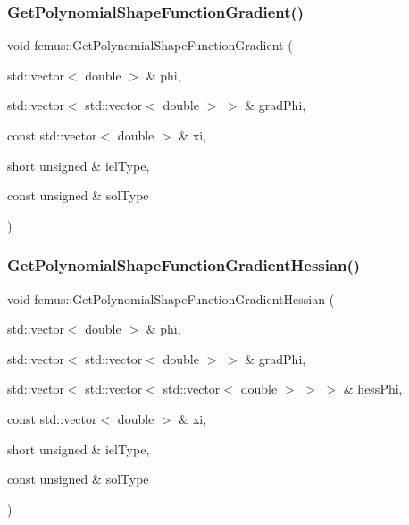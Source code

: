 \subsubsection{\texorpdfstring{Get\+Polynomial\+Shape\+Function\+Gradient()}{GetPolynomialShapeFunctionGradient()}}
{\footnotesize\ttfamily void femus\+::\+Get\+Polynomial\+Shape\+Function\+Gradient (\begin{DoxyParamCaption}\item[{std\+::vector$<$ double $>$ \&}]{phi,  }\item[{std\+::vector$<$ std\+::vector$<$ double $>$ $>$ \&}]{grad\+Phi,  }\item[{const std\+::vector$<$ double $>$ \&}]{xi,  }\item[{short unsigned \&}]{iel\+Type,  }\item[{const unsigned \&}]{sol\+Type }\end{DoxyParamCaption})}

\mbox{\label{namespacefemus_ab0032e28243ff5a107a12dfdc4672a47}} 
\subsubsection{\texorpdfstring{Get\+Polynomial\+Shape\+Function\+Gradient\+Hessian()}{GetPolynomialShapeFunctionGradientHessian()}}
{\footnotesize\ttfamily void femus\+::\+Get\+Polynomial\+Shape\+Function\+Gradient\+Hessian (\begin{DoxyParamCaption}\item[{std\+::vector$<$ double $>$ \&}]{phi,  }\item[{std\+::vector$<$ std\+::vector$<$ double $>$ $>$ \&}]{grad\+Phi,  }\item[{std\+::vector$<$ std\+::vector$<$ std\+::vector$<$ double $>$ $>$ $>$ \&}]{hess\+Phi,  }\item[{const std\+::vector$<$ double $>$ \&}]{xi,  }\item[{short unsigned \&}]{iel\+Type,  }\item[{const unsigned \&}]{sol\+Type }\end{DoxyParamCaption})}

\mbox{\label{namespacefemus_ae2bcb04cc922daa697c7bf79bfe513ad}} 
